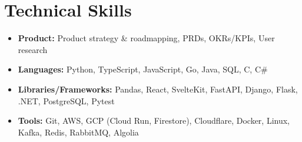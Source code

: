 \documentclass[letterpaper,11pt]{article}
\newcommand{\resumeItemThin}[1]{
  \item{
    {#1 \vspace{-5pt}}
  }
}
\newcommand{\resumeItemListStart}{\vspace{3pt}\begin{itemize}[leftmargin=0.15in, rightmargin=0.15in]}
\newcommand{\resumeItemListEnd}{\end{itemize}\vspace{-5pt}}
\begin{document}
\section{Technical Skills}
\vspace{3pt}
\resumeItemListStart
\resumeItemThin{\textbf{Product: } Product strategy \& roadmapping, PRDs, OKRs/KPIs, User research}\\
\resumeItemThin{\textbf{Languages: } Python, TypeScript, JavaScript, Go, Java, SQL, C, C\#}\\
\resumeItemThin{\textbf{Libraries/Frameworks: } Pandas, React, SvelteKit, FastAPI, Django, Flask, .NET, PostgreSQL, Pytest}\\
\resumeItemThin{\textbf{Tools: } Git, AWS, GCP (Cloud Run, Firestore), Cloudflare, Docker, Linux, Kafka, Redis, RabbitMQ, Algolia}\\
\resumeItemListEnd
\end{document}
